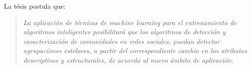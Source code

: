 \documentclass[
	11pt,oneside,a4paper
]{article}
\begin{document}


La tésis postula que:

\begin{quote}
	\emph{
	La aplicación de técnicas de machine learning para el entrenamiento de algoritmos inteligentes posibilitará que los algoritmos de detección y caracterización de comunidades en redes sociales, puedan detectar agrupaciones estelares, a partir del correspondiente cambio en los atributos descriptivos y estructurales, de acuerdo al nuevo ámbito de aplicación.}
\end{quote}






\end{document}
